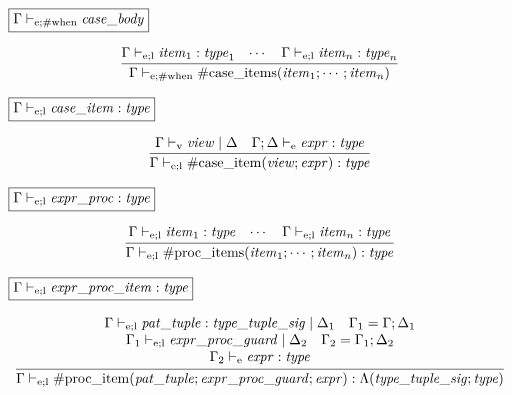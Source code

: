 $\fbox{$\Gamma \vdash_{\mathrm{e}; \mathrm{\#when}} \mathit{case\_body}$}$

\begin{gather*}
    \infer{\Gamma \vdash_{\mathrm{e}; \mathrm{\#when}} \mathrm{\#case\_items}(\mathit{item}_1; \cdots; \mathit{item}_n)}{
        \Gamma \vdash_{\mathrm{e}; \mathrm{l}} \mathit{item}_1: \mathit{type}_1
        &
        \cdots
        &
        \Gamma \vdash_{\mathrm{e}; \mathrm{l}} \mathit{item}_n: \mathit{type}_n
    }
\end{gather*}

$\fbox{$\Gamma \vdash_{\mathrm{e}; \mathrm{l}} \mathit{case\_item}: \mathit{type}$}$

\begin{gather*}
    \infer{\Gamma \vdash_{\mathrm{e}; \mathrm{l}} \mathrm{\#case\_item}(\mathit{view}; \mathit{expr}): \mathit{type}}{
        \Gamma \vdash_\mathrm{v} \mathit{view} \mid \Delta
        &
        \Gamma; \Delta \vdash_\mathrm{e} \mathit{expr}: \mathit{type}
    }
\end{gather*}

$\fbox{$\Gamma \vdash_{\mathrm{e}; \mathrm{l}} \mathit{expr\_proc}: \mathit{type}$}$

\begin{gather*}
    \infer{\Gamma \vdash_{\mathrm{e}; \mathrm{l}} \mathrm{\#proc\_items}(\mathit{item}_1; \cdots; \mathit{item}_n): \mathit{type}}{
        \Gamma \vdash_{\mathrm{e}; \mathrm{l}} \mathit{item}_1: \mathit{type}
        &
        \cdots
        &
        \Gamma \vdash_{\mathrm{e}; \mathrm{l}} \mathit{item}_n: \mathit{type}
    }
\end{gather*}

$\fbox{$\Gamma \vdash_{\mathrm{e}; \mathrm{l}} \mathit{expr\_proc\_item}: \mathit{type}$}$

\begin{gather*}
    \infer{\Gamma \vdash_{\mathrm{e}; \mathrm{l}} \mathrm{\#proc\_item}(\mathit{pat\_tuple}; \mathit{expr\_proc\_guard}; \mathit{expr}): \Lambda(\mathit{type\_tuple\_sig} ;\mathit{type})}{
        \begin{array}{c}
            \Gamma \vdash_{\mathrm{e}; \mathrm{l}} \mathit{pat\_tuple}: \mathit{type\_tuple\_sig} \mid \Delta_1
            \hspace{1em}
            \Gamma_1 = \Gamma; \Delta_1
            \\
            \Gamma_1 \vdash_{\mathrm{e}; \mathrm{l}} \mathit{expr\_proc\_guard} \mid \Delta_2
            \hspace{1em}
            \Gamma_2 = \Gamma_1; \Delta_2
            \\
            \Gamma_2 \vdash_\mathrm{e} \mathit{expr}: \mathit{type}
        \end{array}
    }
\end{gather*}

